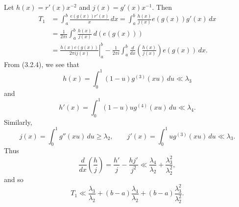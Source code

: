 \documentclass[10pt]{article}
\begin{document}
Let $h(x)=r'(x)x^{-2}$ and $j(x)=g'(x)x^{-1}$. Then
\[
\begin{aligned}
 T_1
 &=\int_a^b\frac{e(g(x))r'(x)}x\,dx
  =\int_a^b\frac{h(x)}{j(x)}e(g(x))g'(x)\,dx \\
 &=\frac1{2\pi i}\int_a^b\frac{h(x)}{j(x)}\,d(e(g(x))) \\
 &=\left.\frac{h(x)e(g(x))}{2\pi i j(x)}\right|_a^b
   -\frac1{2\pi i}\int_a^b
       \frac{d}{dx}\left(\frac{h(x)}{j(x)}\right)e(g(x))\,dx.
\end{aligned}
\]
From (3.2.4), we see that
\[
 h(x)=\int_0^1(1-u)g^{(3)}(xu)\,du\ll\lambda_3
\]
and
\[
 h'(x)=\int_0^1(1-u)u g^{(4)}(xu)\,du\ll\lambda_4.
\]
Similarly,
\[
 j(x)=\int_0^1g''(xu)\,du\geq\lambda_2,
 \qquad
 j'(x)=\int_0^1u g^{(3)}(xu)\,du\ll\lambda_3.
\]
Thus
\[
 \frac{d}{dx}\left(\frac hj\right)
 =\frac{h'}j-\frac{hj'}{j^2}
 \ll\frac{\lambda_4}{\lambda_2}
     +\frac{\lambda_3^2}{\lambda_2^2},
\]
and so
\[
 T_1\ll\frac{\lambda_3}{\lambda_2}
 +(b-a)\frac{\lambda_4}{\lambda_2}
 +(b-a)\frac{\lambda_3^2}{\lambda_2^2}.
\]
\end{document}
